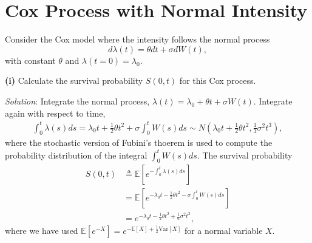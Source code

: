 \documentclass[paper=a4, fontsize=11pt]{scrartcl} %
\numberwithin{equation}{section} %
\numberwithin{figure}{section} %
\numberwithin{table}{section} %
\begin{document}
\newpage

\section{Cox Process with Normal Intensity}
Consider the Cox model where the intensity follows the normal process
$$
d\lambda(t) = \theta dt +\sigma dW(t),
$$
with constant $\theta$ and $\lambda(t=0)=\lambda_0$.

\textbf{(i) }Calculate the survival probability $S(0,t)$ for this Cox process.

\textit{Solution}: Integrate the normal process,
$ \lambda(t) = \lambda_0+ \theta t + \sigma W(t)$.
Integrate again with respect to time,
\begin{align}
\nonumber \int_0^t \lambda(s)ds = \lambda_0 t + \frac{1}{2}\theta t^2 + \sigma\int_0^t W(s)ds
\sim N\left(\lambda_0 t + \frac{1}{2}\theta t^2, \frac{1}{3}\sigma^2 t^3\right),
\end{align}
where the stochastic version of Fubini's thoerem is used to compute the probability distribution of the integral $\int_0^t W(s)ds$. The survival probability
\begin{align}
\nonumber S(0,t) &\triangleq \mathbb{E}\left[e^{-\int_0^t \lambda(s)ds}\right]\\
\nonumber &= \mathbb{E}\left[e^{- \lambda_0 t - \frac{1}{2}\theta t^2 - \sigma\int_0^t W(s)ds }\right]\\
\nonumber &= e^{- \lambda_0 t - \frac{1}{2}\theta t^2 +\frac{1}{6}\sigma^2 t^3 },
\end{align}
where we have used $\mathbb{E}\left[e^{-X}\right]=e^{-\mathbb{E}[X]+\frac{1}{2}\text{Var}[X]}$ for a normal variable $X$.\\
\end{document}
